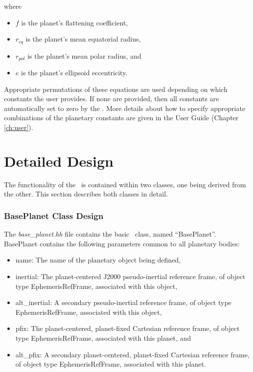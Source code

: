 where
\begin{itemize}
\item $f$ is the planet's flattening coefficient,
\item $r_{eq}$ is the planet's mean equatorial radius,
\item $r_{pol}$ is the planet's mean polar radius, and
\item $e$ is the planet's ellipsoid eccentricity.
\end{itemize}

Appropriate permutations of these equations are used depending on which
constants the user provides.  If none are provided, then all constants are
automatically set to zero by the \planetDesc.  More details about how to
specify appropriate combinations of the planetary constants
are given in the User Guide (Chapter \ref{ch:user}).


\section{Detailed Design}

The functionality of the \planetDesc\ is contained within two classes, one
being derived from the other. This section describes both classes in detail.

\subsubsection{BasePlanet Class Design}

The {\em base\_planet.hh} file contains the basic \planetDesc\ class, named
``BasePlanet''.  BasePlanet contains the following parameters common to all
planetary bodies:

\begin{itemize}
\item{name:} The name of the planetary object being defined,

\item{inertial:} The planet-centered J2000 pseudo-inertial reference frame, of
object type EphemerisRefFrame, associated with this object,

\item{alt\_inertial:} A secondary pseudo-inertial reference frame, of
object type EphemerisRefFrame, associated with this object, 

\item{pfix:} The planet-centered, planet-fixed Cartesian reference frame, of
object type EphemerisRefFrame, associated with this planet, and

\item{alt\_pfix:} A secondary planet-centered, planet-fixed Cartesian 
reference frame, of object type EphemerisRefFrame, associated with this planet.
\end{itemize}


